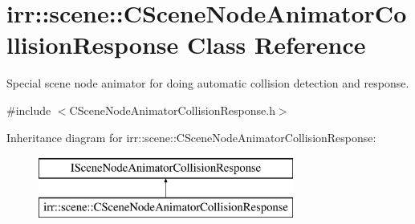\hypertarget{classirr_1_1scene_1_1_c_scene_node_animator_collision_response}{\section{irr\-:\-:scene\-:\-:C\-Scene\-Node\-Animator\-Collision\-Response Class Reference}
\label{classirr_1_1scene_1_1_c_scene_node_animator_collision_response}
}


Special scene node animator for doing automatic collision detection and response.  




{\ttfamily \#include $<$C\-Scene\-Node\-Animator\-Collision\-Response.\-h$>$}

Inheritance diagram for irr\-:\-:scene\-:\-:C\-Scene\-Node\-Animator\-Collision\-Response\-:\begin{figure}[H]
\begin{center}
\leavevmode
\includegraphics[height=2.000000cm]{classirr_1_1scene_1_1_c_scene_node_animator_collision_response}
\end{center}
\end{figure}

